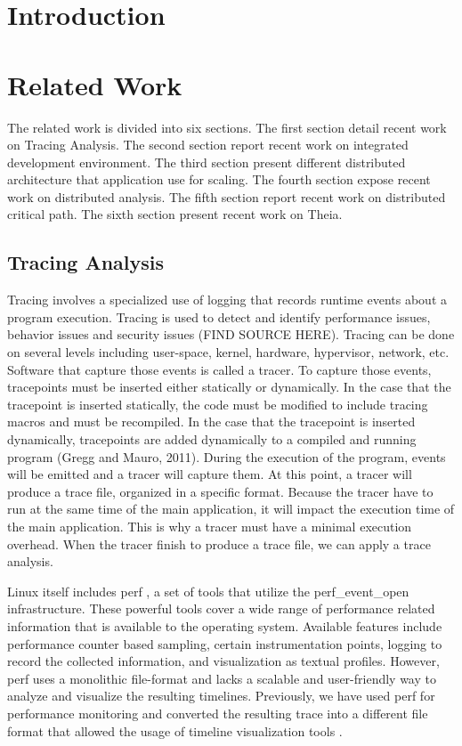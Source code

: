 \label{sec:architecture}

\section{Introduction}

\section{Related Work}

The related work is divided into six sections. The first section detail recent work on Tracing Analysis. The second section report recent work on integrated development environment. The third section present different distributed architecture that application use for scaling. The fourth section expose recent work on distributed analysis. The fifth section report recent work on distributed critical path. The sixth section present recent work on Theia.

\subsection{Tracing Analysis}

Tracing involves a specialized use of logging that records runtime events about a program execution. Tracing is used to detect and identify performance issues, behavior issues and security issues (FIND SOURCE HERE). Tracing can be done on several levels including user-space, kernel, hardware, hypervisor, network, etc. Software that capture those events is called a tracer. To capture those events, tracepoints must be inserted either statically or dynamically. In the case that the tracepoint is inserted statically, the code must be modified to include tracing macros and must be recompiled. In the case that the tracepoint is inserted dynamically, tracepoints are added dynamically to a compiled and running program (Gregg and Mauro, 2011). During the execution of the program, events will be emitted and a tracer will capture them. At this point, a tracer will produce a trace file, organized in a specific format. Because the tracer have to run at the same time of the main application, it will impact the execution time of the main application. This is why a tracer must have a minimal execution overhead. When the tracer finish to produce a trace file, we can apply a trace analysis.

Linux itself includes perf \cite{kernelPerfWiki}, a set of tools that utilize the perf\_event\_open \cite{man7Perf} infrastructure. These powerful tools cover a wide range of performance related information that is available to the operating system. Available features include performance counter based sampling, certain instrumentation points, logging to record the collected information, and visualization as textual profiles. However, perf uses a monolithic file-format and lacks a scalable and user-friendly way to analyze and visualize the resulting timelines. Previously, we have used perf for performance monitoring and converted the resulting trace into a different file format that allowed the usage of timeline visualization tools \cite{schone2014scalable}.


